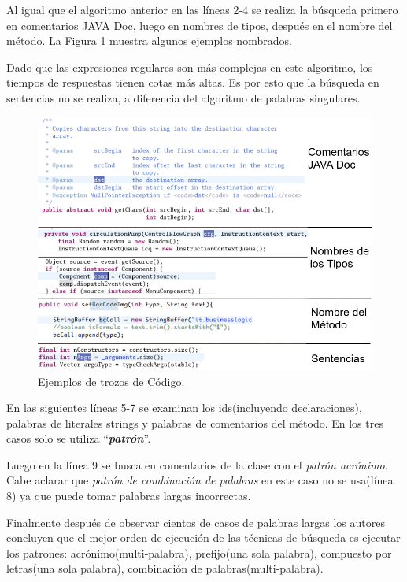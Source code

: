 \documentclass[a4paper,12pt]{report}
\begin{document}
Al igual que el algoritmo anterior en las líneas 2-4 se realiza la búsqueda primero en comentarios JAVA Doc, luego en nombres de tipos, después en el nombre del método. La Figura \ref{exp3} muestra algunos ejemplos nombrados.

Dado que las expresiones regulares son más complejas en este algoritmo, los tiempos de respuestas tienen cotas más altas. Es por esto que la búsqueda en sentencias no se realiza, a diferencia del algoritmo de palabras singulares.

\begin{figure}[t] %
\centerline{%
\includegraphics[scale=0.7]{./exp_3.png}
}
\caption{Ejemplos de trozos de Código.}
\label{exp3}
\end{figure}

En las siguientes líneas 5-7 se examinan los ids(incluyendo declaraciones), palabras de literales strings y palabras de comentarios del método. En los tres casos solo se utiliza “\textit{\textbf{patrón}}”.

Luego en la línea 9 se busca en comentarios de la clase con el \textit{patrón acrónimo}. Cabe aclarar que \textit{patrón de combinación de palabras} en este caso no se usa(línea 8) ya que puede tomar palabras largas incorrectas.

Finalmente después de observar cientos de casos de palabras largas los autores concluyen que el mejor orden de ejecución de las técnicas de búsqueda es ejecutar los patrones: acrónimo(multi-palabra), prefijo(una sola palabra), compuesto por letras(una sola palabra), combinación de palabras(multi-palabra).
\end{document}
